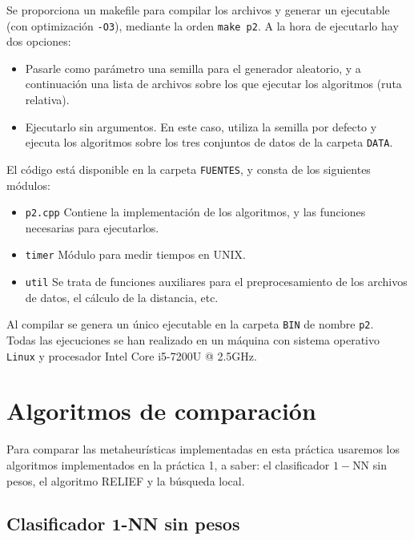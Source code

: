 \documentclass[12pt]{article}
\begin{document}
Se proporciona un makefile para compilar los archivos y generar un ejecutable (con optimización \verb|-O3|), mediante la orden \verb|make p2|. A la hora de ejecutarlo hay dos opciones:

\begin{itemize}
    \item Pasarle como parámetro una semilla para el generador aleatorio, y a continuación una lista de archivos sobre los que ejecutar los algoritmos (ruta relativa).
    \item Ejecutarlo sin argumentos. En este caso, utiliza la semilla por defecto y ejecuta los algoritmos sobre los tres conjuntos de datos de la carpeta \verb|DATA|.
\end{itemize}

El código está disponible en la carpeta \verb|FUENTES|, y consta de los siguientes módulos:

\begin{itemize}
	\item \verb|p2.cpp| Contiene la implementación de los algoritmos, y las funciones necesarias para ejecutarlos.
	\item \verb|timer| Módulo para medir tiempos en UNIX.
	\item \verb|util| Se trata de funciones auxiliares para el preprocesamiento de los archivos de datos, el cálculo de la distancia, etc.
\end{itemize}

Al compilar se genera un único ejecutable en la carpeta \verb|BIN| de nombre \verb|p2|.\\

Todas las ejecuciones se han realizado en un máquina con sistema operativo \verb|Linux| y procesador Intel Core i5-7200U @ 2.5GHz.

\newpage
\section{Algoritmos de comparación}

Para comparar las metaheurísticas implementadas en esta práctica usaremos los algoritmos implementados en la práctica 1, a saber: el clasificador $1-$NN sin pesos, el algoritmo RELIEF y la búsqueda local.

\subsection*{{\color{red} Clasificador $\mathbf{1}$-NN sin pesos}}
\end{document}
